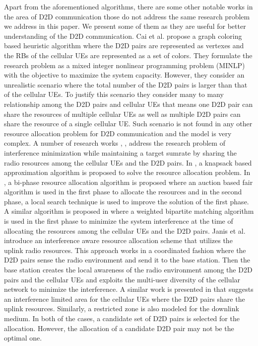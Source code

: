 \documentclass[times]{dacauth}
\begin{document}
\vspace {-0.3cm}
\noindent
Apart from the aforementioned algorithms, there are some other notable works in the area of D2D communication those do not address the same research problem we address in this paper. We present some of them as they are useful for better understanding of the D2D communication. Cai et al.\cite{cai} propose a graph coloring based heuristic algorithm where the D2D pairs are represented as vertexes and the RBs of the cellular UEs are represented as a set of colors. They formulate the research problem as a mixed integer nonlinear programming problem (MINLP) with the objective to maximize the system capacity. However, they consider an unrealistic scenario where the total number of the D2D pairs is larger than that of the cellular UEs. To justify this scenario they consider many to many relationship among the D2D pairs and cellular UEs that means one D2D pair can share the resources of multiple cellular UEs as well as multiple D2D pairs can share the resource of a single cellular UE. Such scenario is not found in any other resource allocation problem for D2D communication and the model is very complex. A number of research works \cite{icc}, \cite{islam2016radio}, \cite{islam2015reducing} address the research problem of interference minimization while maintaining a target sumrate by sharing the radio resources among the cellular UEs and the D2D pairs. In \cite{islam2015reducing}, a knapsack based approximation algorithm is proposed to solve the resource allocation problem. In \cite{islam2016radio}, a bi-phase resource allocation algorithm is proposed where an auction based fair algorithm is used in the first phase to allocate the resources and in the second phase, a local search technique is used to improve the solution of the first phase. A similar algorithm is proposed in \cite{icc} where a weighted bipartite matching algorithm is used in the first phase to minimize the system interference at the time of allocating the resources among the cellular UEs and the D2D pairs. Janis et al. \cite{janis} introduce an interference aware resource allocation scheme that utilizes the uplink radio resources. This approach works in a coordinated fashion where the D2D pairs sense the radio environment and send it to the base station. Then the base station creates the local awareness of the radio environment among the D2D pairs and the cellular UEs and exploits the multi-user diversity of the cellular network to minimize the interference. A similar work is presented in \cite{min2011capacity} that suggests an interference limited area for the cellular UEs where the D2D pairs share the uplink resources. Similarly, a restricted zone is also modeled for the downlink medium. In both of the cases, a candidate set of D2D pairs is selected for the allocation. However, the allocation of a candidate D2D pair may not be the optimal one. 
\end{document}
